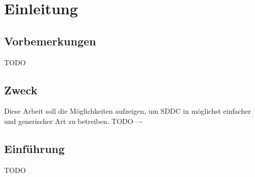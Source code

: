 
\chapter{Einleitung}

\section{Vorbemerkungen}
TODO
\section{Zweck}
Diese Arbeit soll die Möglichkeiten aufzeigen, um \ac{SDDC} in möglichst einfacher 
und generischer Art zu betreiben.
TODO----
\section{Einführung}
TODO